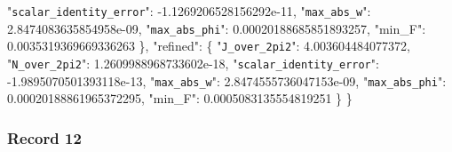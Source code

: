\documentclass[
  10pt,
]{article}
\newenvironment{Shaded}{}{}
\newcommand{\DataTypeTok}[1]{\textcolor[rgb]{0.56,0.13,0.00}{#1}}
\newcommand{\FloatTok}[1]{\textcolor[rgb]{0.25,0.63,0.44}{#1}}
\newcommand{\FunctionTok}[1]{\textcolor[rgb]{0.02,0.16,0.49}{#1}}
\begin{document}
\begin{Shaded}
\begin{Highlighting}[]
    \DataTypeTok{"\nolinkurl{scalar_identity_error}"}\FunctionTok{:} \FloatTok{{-}1.1269206528156292e{-}11}\FunctionTok{,}
    \DataTypeTok{"\nolinkurl{max_abs_w}"}\FunctionTok{:} \FloatTok{2.8474083635854958e{-}09}\FunctionTok{,}
    \DataTypeTok{"\nolinkurl{max_abs_phi}"}\FunctionTok{:} \FloatTok{0.00020188685851893257}\FunctionTok{,}
    \DataTypeTok{"min\_F"}\FunctionTok{:} \FloatTok{0.0035319369669336263}
  \FunctionTok{\},}
  \DataTypeTok{"refined"}\FunctionTok{:} \FunctionTok{\{}
    \DataTypeTok{"\nolinkurl{J_over_2pi2}"}\FunctionTok{:} \FloatTok{4.003604484077372}\FunctionTok{,}
    \DataTypeTok{"\nolinkurl{N_over_2pi2}"}\FunctionTok{:} \FloatTok{1.2609988968733602e{-}18}\FunctionTok{,}
    \DataTypeTok{"\nolinkurl{scalar_identity_error}"}\FunctionTok{:} \FloatTok{{-}1.9895070501393118e{-}13}\FunctionTok{,}
    \DataTypeTok{"\nolinkurl{max_abs_w}"}\FunctionTok{:} \FloatTok{2.8474555736047153e{-}09}\FunctionTok{,}
    \DataTypeTok{"\nolinkurl{max_abs_phi}"}\FunctionTok{:} \FloatTok{0.00020188861965372295}\FunctionTok{,}
    \DataTypeTok{"min\_F"}\FunctionTok{:} \FloatTok{0.0005083135554819251}
  \FunctionTok{\}}
\FunctionTok{\}}
\end{Highlighting}
\end{Shaded}

\hypertarget{record-12}{%
\subsubsection{Record 12}\label{record-12}}
\end{document}
